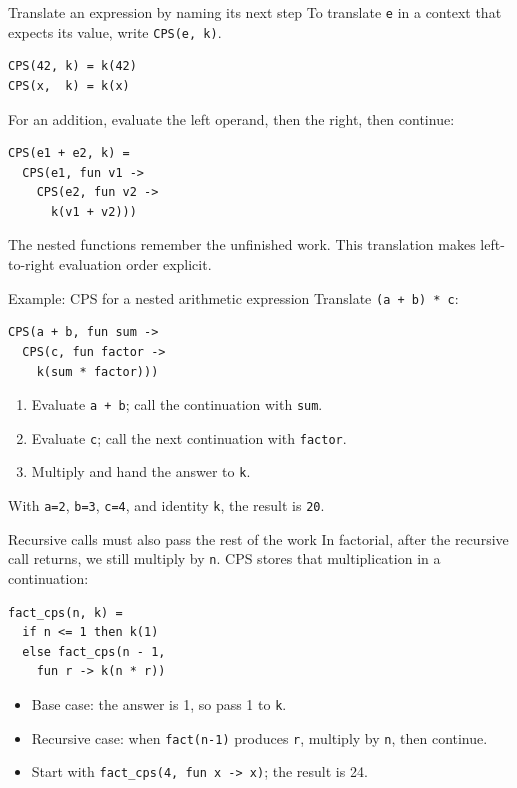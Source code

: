 \documentclass[aspectratio=169,10pt]{beamer}
\begin{document}
\begin{frame}[fragile]{Translate an expression by naming its next step}
  To translate \texttt{e} in a context that expects its value, write
  \texttt{CPS(e, k)}.
  \begin{lstlisting}
CPS(42, k) = k(42)
CPS(x,  k) = k(x)
  \end{lstlisting}
  For an addition, evaluate the left operand, then the right, then continue:
  \begin{lstlisting}
CPS(e1 + e2, k) =
  CPS(e1, fun v1 ->
    CPS(e2, fun v2 ->
      k(v1 + v2)))
  \end{lstlisting}
  The nested functions remember the unfinished work. This translation makes
  left-to-right evaluation order explicit.
\end{frame}

\begin{frame}[fragile]{Example: CPS for a nested arithmetic expression}
  Translate \texttt{(a + b) * c}:
  \begin{lstlisting}
CPS(a + b, fun sum ->
  CPS(c, fun factor ->
    k(sum * factor)))
  \end{lstlisting}
  \begin{enumerate}
    \item Evaluate \texttt{a + b}; call the continuation with \texttt{sum}.
    \item Evaluate \texttt{c}; call the next continuation with \texttt{factor}.
    \item Multiply and hand the answer to \texttt{k}.
  \end{enumerate}
  With \texttt{a=2}, \texttt{b=3}, \texttt{c=4}, and identity \texttt{k},
  the result is \texttt{20}.
\end{frame}

\begin{frame}[fragile]{Recursive calls must also pass the rest of the work}
  In factorial, after the recursive call returns, we still multiply by \texttt{n}.
  CPS stores that multiplication in a continuation:
  \begin{lstlisting}
fact_cps(n, k) =
  if n <= 1 then k(1)
  else fact_cps(n - 1,
    fun r -> k(n * r))
  \end{lstlisting}
  \begin{itemize}
    \item Base case: the answer is 1, so pass 1 to \texttt{k}.
    \item Recursive case: when \texttt{fact(n-1)} produces \texttt{r}, multiply by \texttt{n}, then continue.
    \item Start with \texttt{fact\_cps(4, fun x -> x)}; the result is 24.
  \end{itemize}
\end{frame}
\end{document}
